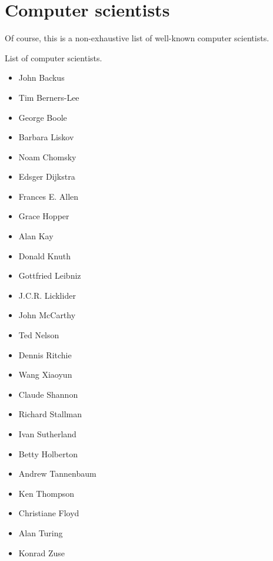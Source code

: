 \section{Computer scientists}
%
Of course, this is a non-exhaustive list of well-known computer scientists.

List of computer scientists.

\begin{itemize}
  \item John Backus
  \item Tim Berners-Lee
  \item George Boole
  \item Barbara Liskov
  \item Noam Chomsky
  \item Edsger Dijkstra
  \item Frances E. Allen
  \item Grace Hopper
  \item Alan Kay
  \item Donald Knuth
  \item Gottfried Leibniz
  \item J.C.R. Licklider
  \item John McCarthy
  \item Ted Nelson
  \item Dennis Ritchie
  \item Wang Xiaoyun
  \item Claude Shannon
  \item Richard Stallman
  \item Ivan Sutherland
  \item Betty Holberton
  \item Andrew Tannenbaum
  \item Ken Thompson
  \item Christiane Floyd
  \item Alan Turing
  \item Konrad Zuse
\end{itemize}
